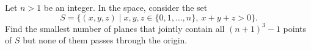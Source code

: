 Let $n > 1$ be an integer. In the space, consider the set
\[
S = \{(x, y, z) \mid x, y, z \in \{0, 1, \ldots, n\},\ x + y + z > 0\}.
\]
Find the smallest number of planes that jointly contain all $(n + 1)^{3} - 1$ points of $S$ but none of them passes through the origin.
